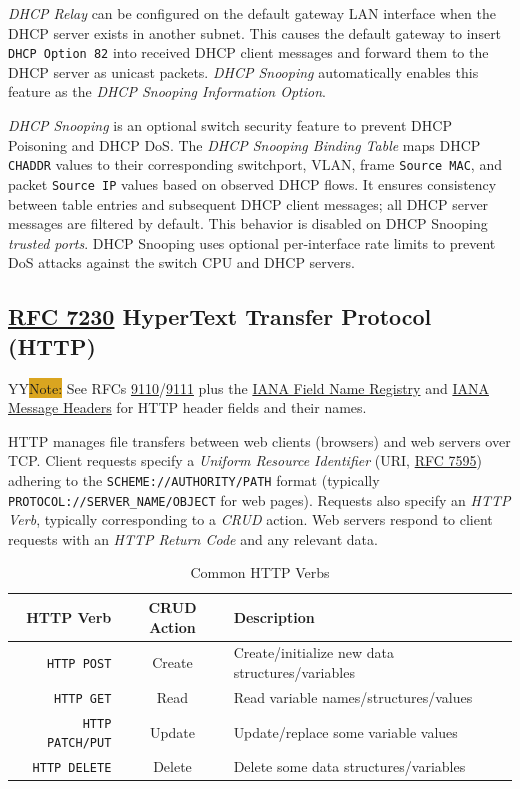 \documentclass[12pt]{article}
\newcommand{\printColor}{Y}								%
\newcommand{\note}[1]{\if\printColor Y{\colorbox{#1}{Note:}}\else{\underline{Note:}}\fi}
\newcommand{\rfc}[1]{\href{https://datatracker.ietf.org/doc/html/rfc#1}{#1}}
\newcommand{\RFC}[1]{\href{https://datatracker.ietf.org/doc/html/rfc#1}{RFC #1}}
\begin{document}
	\textit{DHCP Relay} can be configured on the default gateway LAN interface when the DHCP server exists in another subnet. This causes the default gateway to insert \texttt{DHCP Option 82} into received DHCP client messages and forward them to the DHCP server as unicast packets. \textit{DHCP Snooping} automatically enables this feature as the \textit{DHCP Snooping Information Option}.

	\textit{DHCP Snooping} is an optional switch security feature to prevent DHCP Poisoning and DHCP DoS. The \textit{DHCP Snooping Binding Table} maps DHCP \texttt{CHADDR} values to their corresponding switchport, VLAN, frame \texttt{Source MAC}, and packet \texttt{Source IP} values based on observed DHCP flows. It ensures consistency between table entries and subsequent DHCP client messages; all DHCP server messages are filtered by default. This behavior is disabled on DHCP Snooping \textit{trusted ports}. DHCP Snooping uses optional per-interface rate limits to prevent DoS attacks against the switch CPU and DHCP servers.


	\subsection[RFC 7230 HTTP]{\RFC{7230} HyperText Transfer Protocol (HTTP) \label{subsec:HTTP}}
	\note{Goldenrod} See RFCs \rfc{9110}/\rfc{9111} plus the \href{https://www.iana.org/assignments/http-fields/http-fields.xhtml#field-names}{IANA Field Name Registry} and \href{https://www.iana.org/assignments/message-headers/message-headers.xml#perm-headers}{IANA Message Headers} for HTTP header fields and their names.

	HTTP manages file transfers between web clients (browsers) and web servers over TCP. Client requests specify a \textit{Uniform Resource Identifier} (URI, \RFC{7595}) adhering to the \texttt{SCHEME://AUTHORITY/PATH} format (typically \texttt{PROTOCOL://SERVER\_NAME/OBJECT} for web pages). Requests also specify an \textit{HTTP Verb}, typically corresponding to a \textit{CRUD} action. Web servers respond to client requests with an \textit{HTTP Return Code} and any relevant data.

	\begin{table}[H]
	\centering
	\caption{Common HTTP Verbs \label{tab:HTTP VERBS}}
	\begin{tabular}{r | c | l}\hline
	\textbf{HTTP Verb}		& \textbf{CRUD Action}	& \textbf{Description}\\\hline
	\texttt{HTTP POST}		& Create			& Create/initialize new data structures/variables\\\hline
	\texttt{HTTP GET}			& Read			& Read variable names/structures/values\\\hline
	\texttt{HTTP PATCH/PUT}	& Update			& Update/replace some variable values\\\hline
	\texttt{HTTP DELETE}		& Delete			& Delete some data structures/variables\\\hline
	\end{tabular}\end{table}
\end{document}
